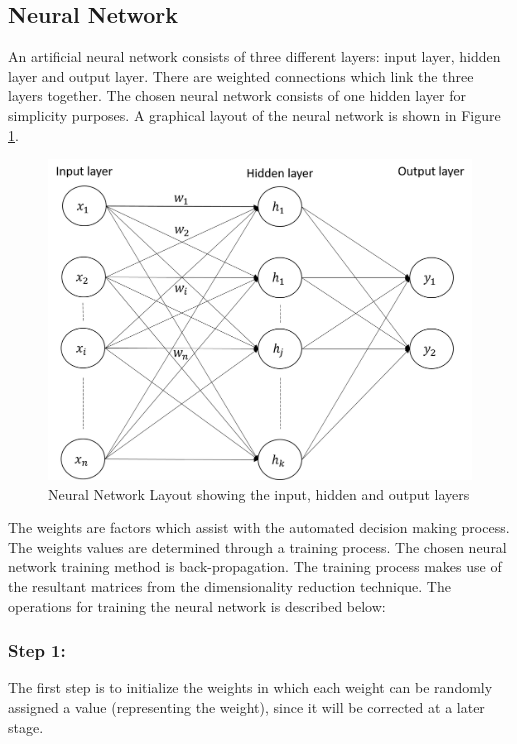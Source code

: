 \documentclass[11pt,twocolumn]{witseiepaper}
\begin{document}
	\subsection{Neural Network}
	An artificial neural network consists of three different layers: input layer, hidden layer and output layer. There are weighted connections which link the three layers together. The chosen neural network consists of one hidden layer for simplicity purposes. 
	A graphical layout of the neural network is shown in Figure \ref{fig: neural_network}.
	\begin{figure}[!h]
		\centering
		\includegraphics[scale=0.25]{neural_network.png}
		\caption{Neural Network Layout showing the input, hidden and output layers}
		\label{fig: neural_network}
	\end{figure}
	
	The weights are factors which assist with the automated decision making process. The weights values are determined through a training process. The chosen neural network training method is back-propagation. The training process makes use of the resultant matrices from the dimensionality reduction technique. The operations for training the neural network is described below:
	
	\subsubsection{Step 1:} 
	The first step is to initialize the weights in which each weight can be randomly assigned a value (representing the weight), since it will be corrected at a later stage.
	
\end{document}
